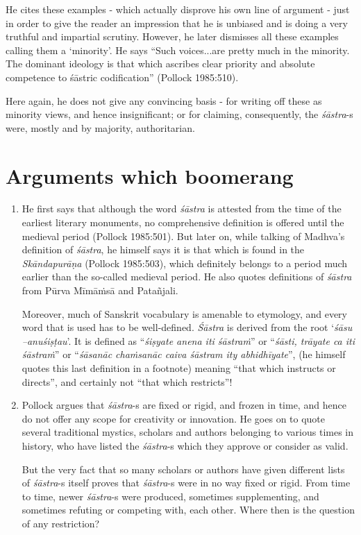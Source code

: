 \begin{enumerate}
He cites these examples - which actually disprove his own line of argument - just in order to give the reader an impression that he is unbiased and is doing a very truthful and impartial scrutiny. However, he later dismisses all these examples calling them a `minority'. He says ``Such voices...are pretty much in the minority. The dominant ideology is that which ascribes clear priority and absolute competence to śāstric codification'' (Pollock 1985:510). 

Here again, he does not give any convincing basis - for writing off these as minority views, and hence insignificant; or for claiming, consequently, the {\it śāstra}-s were, mostly and by majority, authoritarian. 
\end{enumerate}

\section*{Arguments which boomerang}

\begin{enumerate}
\item He first says that although the word {\it śāstra} is attested from the time of the earliest literary monuments, no comprehensive definition is offered until the medieval period (Pollock 1985:501). But later on, while talking of Madhva's definition of {\it śāstra}, he himself says it is that which is found in the {\it Skāndapurāṇa} (Pollock 1985:503), which definitely belongs to a period much earlier than the so-called medieval period. He also quotes definitions of {\it śāstra} from Pūrva Mīmāṁsā and Patañjali. 

Moreover, much of Sanskrit vocabulary is amenable to  etymology, and every word that is used has to be well-defined. {\it Śāstra} is derived from the root `\textsl{śāsu --anuśiṣṭau}'. It is defined as ``\textsl{śiṣyate anena iti śāstraṁ}'' or ``\textsl{śāsti, trāyate ca iti śāstraṁ}'' or ``\textsl{śāsanāc chaṁsanāc caiva śāstram ity abhidhīyate}'', (he himself quotes this last definition in a footnote) meaning ``that which instructs or directs'', and certainly not ``that which restricts''!

\item Pollock argues that {\it śāstra}-s are fixed or rigid, and frozen in time, and hence do not offer any scope for creativity or innovation. He goes on to quote several traditional mystics, scholars and authors belonging to various times in history, who have listed the {\it śāstra}-s which they approve or consider as valid. 

But the very fact that so many scholars or authors have given different lists of {\it śāstra}-s itself proves that {\it śāstra}-s were in no way fixed or rigid. From time to time, newer {\it śāstra}-s were produced, sometimes supplementing, and sometimes refuting or competing with, each other. Where then is the question of any restriction?
\end{enumerate}


